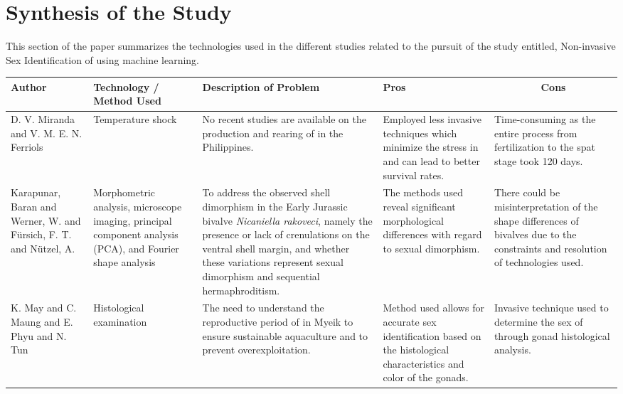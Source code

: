 \section{Synthesis of the Study}
This section of the paper summarizes the technologies used in the different studies related to the pursuit of the study entitled, Non-invasive Sex Identification of \Tgranosa using machine learning.

\begin{table}[]
	\centering
	\renewcommand{\arraystretch}{3} 
	\begin{adjustbox}{scale=0.55,center}
	\normalsize
	\begin{tabular}{|p{5cm}|p{5cm}|p{8cm}|p{8cm}|p{8cm}|}
		\hline
		\centering
		\textbf{Author} &
		\centering
		\textbf{Technology / Method Used} &
		\centering
		\textbf{Description of Problem} &
		\centering
		\textbf{Pros} &
		\multicolumn{1}{c|}{\textbf{Cons}} \\ \hline
		
		D. V. Miranda and V. M. E. N. Ferriols &
		Temperature shock &
		No recent studies are available on the production and rearing of \textit{\Tgranosa} in the Philippines. &
		Employed less invasive techniques which minimize the stress in \textit{\Tgranosa} and can lead to better survival rates. &
		Time-consuming as the entire process from fertilization to the spat stage took 120 days. \\ \hline
		
		Karapunar, Baran and Werner, W. and Fürsich, F. T. and Nützel, A. &
		Morphometric analysis, microscope imaging, principal component analysis (PCA), and Fourier shape analysis &
		To address the observed shell dimorphism in the Early Jurassic bivalve \textit{Nicaniella rakoveci}, namely the presence or lack of crenulations on the ventral shell margin, and whether these variations represent sexual dimorphism and sequential hermaphroditism. &
		The methods used reveal significant morphological differences with regard to sexual dimorphism. &
		There could be misinterpretation of the shape differences of bivalves due to the constraints and resolution of technologies used. \\ \hline
		
		K. May and C. Maung and E. Phyu and N. Tun &
		Histological examination &
		The need to understand the reproductive period of \textit{\Tgranosa} in Myeik to ensure sustainable aquaculture and to prevent overexploitation. &
		Method used allows for accurate sex identification based on the histological characteristics and color of the gonads. &
		Invasive technique used to determine the sex of \textit{\Tgranosa} through gonad histological analysis. \\ \hline
		

\end{tabular}
\end{adjustbox}
\end{table}
